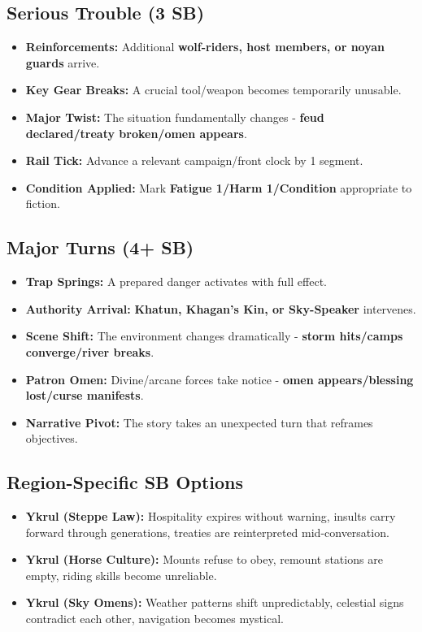 \subsection*{Serious Trouble (3 SB)}
\begin{itemize}
\item \textbf{Reinforcements:} Additional \textbf{wolf-riders, host members, or noyan guards} arrive.
\item \textbf{Key Gear Breaks:} A crucial tool/weapon becomes temporarily unusable.
\item \textbf{Major Twist:} The situation fundamentally changes - \textbf{feud declared/treaty broken/omen appears}.
\item \textbf{Rail Tick:} Advance a relevant campaign/front clock by 1 segment.
\item \textbf{Condition Applied:} Mark \textbf{Fatigue 1/Harm 1/Condition} appropriate to fiction.
\end{itemize}

\subsection*{Major Turns (4+ SB)}
\begin{itemize}
\item \textbf{Trap Springs:} A prepared danger activates with full effect.
\item \textbf{Authority Arrival:} \textbf{Khatun, Khagan's Kin, or Sky-Speaker} intervenes.
\item \textbf{Scene Shift:} The environment changes dramatically - \textbf{storm hits/camps converge/river breaks}.
\item \textbf{Patron Omen:} Divine/arcane forces take notice - \textbf{omen appears/blessing lost/curse manifests}.
\item \textbf{Narrative Pivot:} The story takes an unexpected turn that reframes objectives.
\end{itemize}

\subsection*{Region-Specific SB Options}
\begin{itemize}
\item \textbf{Ykrul (Steppe Law):} Hospitality expires without warning, insults carry forward through generations, treaties are reinterpreted mid-conversation.
\item \textbf{Ykrul (Horse Culture):} Mounts refuse to obey, remount stations are empty, riding skills become unreliable.
\item \textbf{Ykrul (Sky Omens):} Weather patterns shift unpredictably, celestial signs contradict each other, navigation becomes mystical.
\end{itemize}

